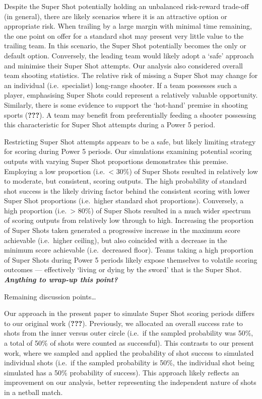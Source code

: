 \documentclass[]{elsarticle} %
\begin{document}
Despite the Super Shot potentially holding an unbalanced risk-reward
trade-off (in general), there are likely scenarios where it is an
attractive option or appropriate risk. When trailing by a large margin
with minimal time remaining, the one point on offer for a standard shot
may present very little value to the trailing team. In this scenario,
the Super Shot potentially becomes the only or default option.
Conversely, the leading team would likely adopt a `safe' approach and
minimise their Super Shot attempts. Our analysis also considered overall
team shooting statistics. The relative risk of missing a Super Shot may
change for an individual (i.e.~specialist) long-range shooter. If a team
possesses such a player, emphasising Super Shots could represent a
relatively valuable opportunity. Similarly, there is some evidence to
support the `hot-hand' premise in shooting sports ({\textbf{???}}). A
team may benefit from preferentially feeding a shooter possessing this
characteristic for Super Shot attempts during a Power 5 period.

Restricting Super Shot attempts appears to be a safe, but likely
limiting strategy for scoring during Power 5 periods. Our simulations
examining potential scoring outputs with varying Super Shot proportions
demonstrates this premise. Employing a low proportion (i.e.~\textless{}
30\%) of Super Shots resulted in relatively low to moderate, but
consistent, scoring outputs. The high probability of standard shot
success is the likely driving factor behind the consistent scoring with
lower Super Shot proportions (i.e.~higher standard shot proportions).
Conversely, a high proportion (i.e.~\textgreater{} 80\%) of Super Shots
resulted in a much wider spectrum of scoring outputs from relatively low
through to high. Increasing the proportion of Super Shots taken
generated a progressive increase in the maximum score achievable
(i.e.~higher ceiling), but also coincided with a decrease in the minimum
score achievable (i.e.~decreased floor). Teams taking a high proportion
of Super Shots during Power 5 periods likely expose themselves to
volatile scoring outcomes --- effectively `living or dying by the sword'
that is the Super Shot. \textbf{\emph{Anything to wrap-up this point?}}

Remaining discussion points\ldots{}

Our approach in the present paper to simulate Super Shot scoring periods
differs to our original work ({\textbf{???}}). Previously, we allocated
an overall success rate to shots from the inner versus outer circle
(i.e.~if the sampled probability was 50\%, a total of 50\% of shots were
counted as successful). This contrasts to our present work, where we
sampled and applied the probability of shot success to simulated
individual shots (i.e.~if the sampled probability is 50\%, the
individual shot being simulated has a 50\% probability of success). This
approach likely reflects an improvement on our analysis, better
representing the independent nature of shots in a netball match.
\end{document}
